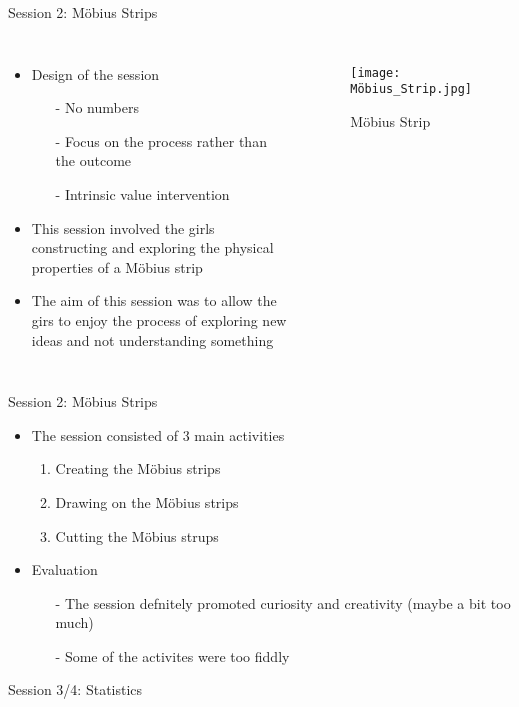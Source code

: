 \documentclass{beamer}  %
\begin{document}
\begin{frame}{Session 2: M\"{o}bius Strips}

    \begin{columns}
        \begin{itemize}
            \item Design of the session
            \begin{itemize}
                \item[-] No numbers
                \item[-] Focus on the process rather than the outcome
                \item[-] Intrinsic value intervention
            \end{itemize} 
            \item This session involved the girls constructing and exploring the physical properties of a M\"{o}bius strip
            \item The aim of this session was to allow the girs to enjoy the process of exploring new ideas and not understanding something
            
        \end{itemize}
        \begin{figure}
            \texttt{[image: Möbius\_Strip.jpg]}
            \caption{M\"{o}bius Strip}
        \end{figure}
    \end{columns}
\end{frame}

\begin{frame}{Session 2: M\"{o}bius Strips}
    \begin{itemize}
        \item The session consisted of 3 main activities
        \begin{enumerate}
            \item Creating the M\"{o}bius strips
            \item Drawing on the M\"{o}bius strips
            \item Cutting the  M\"{o}bius strups
        \end{enumerate}

        \vspace{10pt}

        \item Evaluation
        \begin{itemize}
            \item[-] The session defnitely promoted curiosity and creativity  (maybe a bit too much)
            \item[-] Some of the activites were too fiddly 
        \end{itemize}
    \end{itemize}
\end{frame}
\begin{frame}{Session 3/4: Statistics}

\end{frame}
\end{document}
